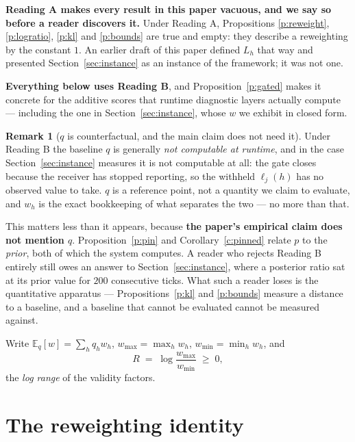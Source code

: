 \documentclass[11pt,a4paper]{article}
\theoremstyle{definition}
\newtheorem{remark}{Remark}
\begin{document}
\textbf{Reading A makes every result in this paper vacuous, and we say so
before a reader discovers it.} Under Reading A, Propositions
\ref{p:reweight}, \ref{p:logratio}, \ref{p:kl} and \ref{p:bounds} are true and
empty: they describe a reweighting by the constant $1$. An earlier draft of
this paper defined $L_h$ that way and presented Section~\ref{sec:instance} as
an instance of the framework; it was not one.

\textbf{Everything below uses Reading B}, and Proposition~\ref{p:gated} makes
it concrete for the additive scores that runtime diagnostic layers actually
compute --- including the one in Section~\ref{sec:instance}, whose $w$ we
exhibit in closed form.

\begin{remark}[$q$ is counterfactual, and the main claim does not need it]
\label{r:counterfactual}
Under Reading B the baseline $q$ is generally \emph{not computable at runtime},
and in the case Section~\ref{sec:instance} measures it is not computable at
all: the gate closes because the receiver has stopped reporting, so the
withheld $\ell_j(h)$ has no observed value to take. $q$ is a reference point,
not a quantity we claim to evaluate, and $w_h$ is the exact bookkeeping of what
separates the two --- no more than that.

This matters less than it appears, because \textbf{the paper's empirical claim
does not mention $q$}. Proposition~\ref{p:pin} and Corollary~\ref{c:pinned}
relate $p$ to the \emph{prior}, both of which the system computes. A reader who
rejects Reading B entirely still owes an answer to Section~\ref{sec:instance},
where a posterior ratio sat at its prior value for $200$ consecutive ticks.
What such a reader loses is the quantitative apparatus ---
Propositions~\ref{p:kl} and \ref{p:bounds} measure a distance to a baseline,
and a baseline that cannot be evaluated cannot be measured against.
\end{remark}

Write $\mathbb{E}_q[w]=\sum_h q_h w_h$, $w_{\max}=\max_h w_h$,
$w_{\min}=\min_h w_h$, and
\begin{equation}
R \;=\; \log\frac{w_{\max}}{w_{\min}} \;\ge\; 0 ,
\end{equation}
the \emph{log range} of the validity factors.

\section{The reweighting identity}
\end{document}

